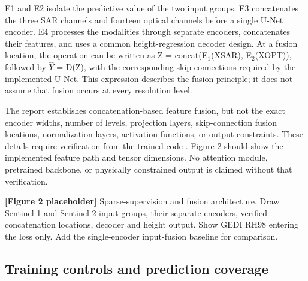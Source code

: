 \begin{table}[t]
\centering
\small
\setlength{\tabcolsep}{3pt}
\caption{Experimental configurations. All variants produce a one-channel height prediction.}
\end{table}

E1 and E2 isolate the predictive value of the two input groups. E3 concatenates the three SAR channels and fourteen optical channels before a single U-Net encoder. E4 processes the modalities through separate encoders, concatenates their features, and uses a common height-regression decoder design. At a fusion location, the operation can be written as Z = concat(E$_1$(XSAR), E$_2$(XOPT)), followed by $\hat{Y}$ = D(Z), with the corresponding skip connections required by the implemented U-Net. This expression describes the fusion principle; it does not assume that fusion occurs at every resolution level.

The report establishes concatenation-based feature fusion, but not the exact encoder widths, number of levels, projection layers, skip-connection fusion locations, normalization layers, activation functions, or output constraints. These details require verification from the trained code . Figure 2 should show the implemented feature path and tensor dimensions. No attention module, pretrained backbone, or physically constrained output is claimed without that verification.

\textbf{[Figure 2 placeholder]} Sparse-supervision and fusion architecture. Draw Sentinel-1 and Sentinel-2 input groups, their separate encoders, verified concatenation locations, decoder and height output. Show GEDI RH98 entering the loss only. Add the single-encoder input-fusion baseline for comparison.

\subsection{Training controls and prediction coverage}


